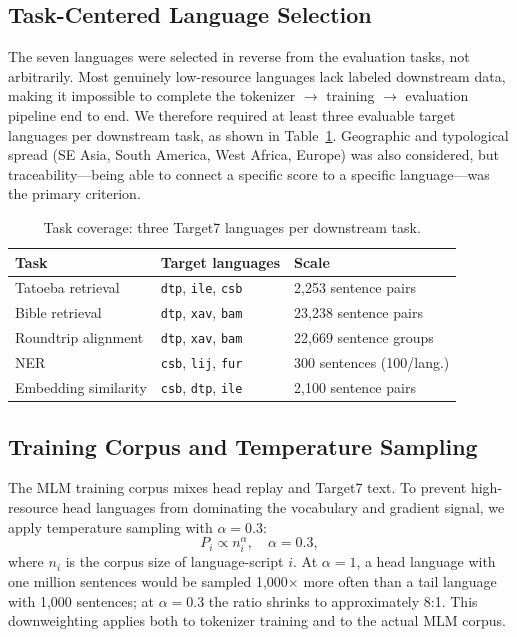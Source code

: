 \subsection{Task-Centered Language Selection}

The seven languages were selected in reverse from the evaluation tasks, not arbitrarily.
Most genuinely low-resource languages lack labeled downstream data, making it impossible to
complete the tokenizer $\to$ training $\to$ evaluation pipeline end to end.
We therefore required at least three evaluable target languages per downstream task,
as shown in Table~\ref{tab:taskcov}.
Geographic and typological spread (SE Asia, South America, West Africa, Europe) was
also considered, but traceability---being able to connect a specific score to a specific
language---was the primary criterion.

\begin{table}[h]\centering\small
\caption{Task coverage: three Target7 languages per downstream task.}
\label{tab:taskcov}
\begin{tabular}{@{}lll@{}}
\toprule
Task & Target languages & Scale \\
\midrule
Tatoeba retrieval & \texttt{dtp}, \texttt{ile}, \texttt{csb} & 2,253 sentence pairs \\
Bible retrieval & \texttt{dtp}, \texttt{xav}, \texttt{bam} & 23,238 sentence pairs \\
Roundtrip alignment & \texttt{dtp}, \texttt{xav}, \texttt{bam} & 22,669 sentence groups \\
NER & \texttt{csb}, \texttt{lij}, \texttt{fur} & 300 sentences (100/lang.) \\
Embedding similarity & \texttt{csb}, \texttt{dtp}, \texttt{ile} & 2,100 sentence pairs \\
\bottomrule
\end{tabular}
\end{table}

\subsection{Training Corpus and Temperature Sampling}

The MLM training corpus mixes head replay and Target7 text.
To prevent high-resource head languages from dominating the vocabulary and gradient signal,
we apply temperature sampling with $\alpha=0.3$:
\[
P_i \propto n_i^{\alpha}, \quad \alpha = 0.3,
\]
where $n_i$ is the corpus size of language-script $i$.
At $\alpha=1$, a head language with one million sentences would be sampled 1,000$\times$
more often than a tail language with 1,000 sentences;
at $\alpha=0.3$ the ratio shrinks to approximately 8:1.
This downweighting applies both to tokenizer training and to the actual MLM corpus.

